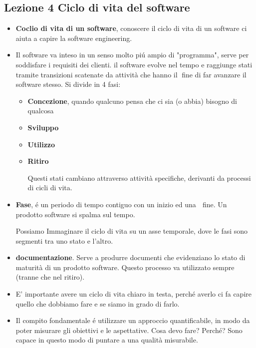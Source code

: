 \documentclass[a4paper,10pt] {article}
\begin{document}
\begin{itemize}
\section{Lezione 4 Ciclo di vita del software}
\begin{itemize}
	\item \textbf{Coclio di vita di un software}, conoscere il ciclo di vita di 
	un software ci aiuta a capire la software engineering. 
	
	
	
	\item Il software va inteso in un senso molto pi\'u ampio di "programma", 
	serve per soddisfare i requisiti dei clienti. il software evolve
	nel tempo e raggiunge stati tramite transizioni scatenate da attività che 
	hanno il fine di far avanzare il software stesso. Si divide in 4 fasi:
	\begin{itemize}
	\item \textbf{Concezione}, quando qualcuno pensa che ci sia (o abbia) 
	bisogno di qualcosa
	\item \textbf{Sviluppo}
	\item \textbf{Utilizzo}
	\item \textbf{Ritiro}
	
	Questi stati cambiano attraverso attività specifiche, derivanti da 
	processi di cicli di vita.
	
	\end{itemize}

	\item \textbf{Fase}, é un periodo di tempo contiguo con un inizio ed una 
	fine. Un prodotto software si spalma sul tempo.
	
	Possiamo Immaginare il ciclo di vita su un asse temporale, dove le fasi 
	sono segmenti tra uno stato e l'altro.
	
	\item \textbf{documentazione}. Serve a produrre documenti che evidenziano 
	lo stato di maturità di un prodotto software. Questo processo va 
	utilizzato sempre (tranne che nel ritiro).
	
	\item E' importante avere un ciclo di vita chiaro in testa, perché averlo 
	ci fa capire quello che dobbiamo fare e se siamo in grado di farlo. 
	
	\item Il compito fondamentale é utilizzare un approccio 
	quantificabile, in modo da poter misurare gli obiettivi e le aspettative. 
	Cosa devo fare? 
	Perché? 
	Sono capace in questo modo di puntare a una qualità misurabile.
	

\end{itemize}
\end{itemize}
\end{document}
